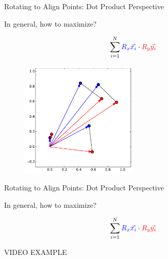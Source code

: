 \documentclass{beamer}
\begin{document}
\begin{frame}{Rotating to Align Points: Dot Product Perspective}

In general, how to maximize?

\[ \sum_{i = 1}^N \textcolor{blue}{R_x \vec{x_i}} \cdot \textcolor{red}{R_y \vec{y_i}} \]
\begin{figure}[t]
	\centering
    \includegraphics[width=0.5\textwidth]{2DProcrustes1.pdf}
\end{figure}


\end{frame}


\begin{frame}{Rotating to Align Points: Dot Product Perspective}

In general, how to maximize?

\[ \sum_{i = 1}^N \textcolor{blue}{R_x \vec{x_i}} \cdot \textcolor{red}{R_y \vec{y_i}} \]

VIDEO EXAMPLE


\end{frame}
\end{document}

